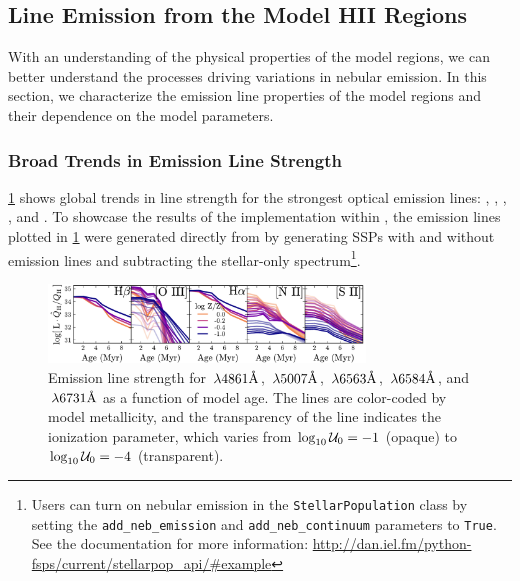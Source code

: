 \subsection{Line Emission from the Model HII Regions}\label{sec:models:lines}

With an understanding of the physical properties of the model \hii regions, we can better understand the processes driving variations in nebular emission. In this section, we characterize the emission line properties of the model \hii regions and their dependence on the model parameters. 

\subsubsection{Broad Trends in Emission Line Strength}\label{sec:models:lines:strength}

\ref{fig:lineVar} shows global trends in line strength for the strongest optical emission lines: \hb{}, \oiii{}, \ha{}, \nii{}, and \sii{}. To showcase the results of the implementation within \FSPS, the emission lines plotted in \ref{fig:lineVar} were generated directly from \pFSPS by generating SSPs with and without emission lines and subtracting the stellar-only spectrum\footnote{Users can turn on nebular emission in the {\tt StellarPopulation} class by setting the {\tt add\_neb\_emission} and {\tt add\_neb\_continuum} parameters to {\tt True}. See the documentation for more information: \url{http://dan.iel.fm/python-fsps/current/stellarpop_api/\#example} }.

\begin{figure}[!htbp]
  \begin{centering}
    \includegraphics[width=0.75\textwidth]{manuscript/chapter2/f14.pdf}
    \caption{Emission line strength for \hb{}$\,\lambda4861\mbox{\AA}$, \oiii{}$\,\lambda5007\mbox{\AA}$, \ha{}$\,\lambda6563\mbox{\AA}$, \nii{}$\,\lambda6584\mbox{\AA}$, and \sii{}$\,\lambda6731\mbox{\AA}$ as a function of model age. The lines are color-coded by model metallicity, and the transparency of the line indicates the ionization parameter, which varies from $\log_{10} \mathcal{U}_0{}=-1$ (opaque) to $\log_{10} \mathcal{U}_0{}=-4$ (transparent).}
    \label{fig:lineVar}
  \end{centering}
\end{figure}

